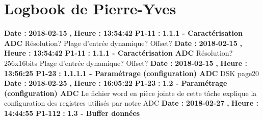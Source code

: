 \documentclass{article}%
\begin{document}
\section{Logbook de Pierre{-}Yves}%
\textbf{Date : }%
\textbf{2018{-}02{-}15}%
\textbf{,}%
\textbf{ Heure : }%
\textbf{13:54:42}%
\newline%
%
\textbf{P1{-}11 }%
\textbf{ : }%
\textbf{ 1.1.1 {-} Caractérisation ADC}%
\newline%
\newline%
%
Résolution?\newline%
Plage d'entrée dynamique?\newline%
Offset?\newline%
\newline%
%
\textbf{Date : }%
\textbf{2018{-}02{-}15}%
\textbf{,}%
\textbf{ Heure : }%
\textbf{13:54:42}%
\newline%
%
\textbf{P1{-}11 }%
\textbf{ : }%
\textbf{ 1.1.1 {-} Caractérisation ADC}%
\newline%
\newline%
%
Résolution? 256x16bits\newline%
Plage d'entrée dynamique?\newline%
Offset?\newline%
\newline%
%
\textbf{Date : }%
\textbf{2018{-}02{-}15}%
\textbf{,}%
\textbf{ Heure : }%
\textbf{13:56:25}%
\newline%
%
\textbf{P1{-}23 }%
\textbf{ : }%
\textbf{ 1.1.1.1 {-} Paramétrage (configuration) ADC}%
\newline%
\newline%
%
DSK page20\newline%
\newline%
%
\textbf{Date : }%
\textbf{2018{-}02{-}25}%
\textbf{,}%
\textbf{ Heure : }%
\textbf{16:05:22}%
\newline%
%
\textbf{P1{-}23 }%
\textbf{ : }%
\textbf{ 1.2 {-} Paramétrage (configuration) ADC}%
\newline%
\newline%
%
Le fichier word en pièce jointe de cette tâche explique la configuration des registres utilisés par notre ADC\newline%
\newline%
%
\textbf{Date : }%
\textbf{2018{-}02{-}27}%
\textbf{,}%
\textbf{ Heure : }%
\textbf{14:44:55}%
\newline%
%
\textbf{P1{-}112 }%
\textbf{ : }%
\textbf{ 1.3 {-} Buffer données}%
\newline%
\newline%
\end{document}
